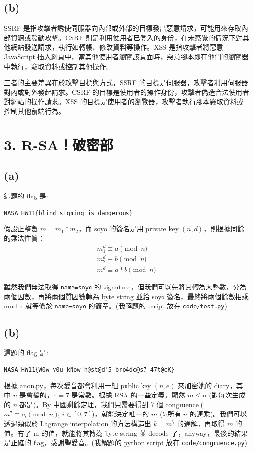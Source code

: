 \documentclass[12pt]{article}
\begin{document}
\subsection*{(b)}
SSRF 是指攻擊者誘使伺服器向內部或外部的目標發出惡意請求，可能用來存取內部資源或發動攻擊。CSRF 則是利用使用者已登入的身份，在未察覺的情況下對其他網站發送請求，執行如轉帳、修改資料等操作。XSS 是指攻擊者將惡意 JavaScript 插入網頁中，當其他使用者瀏覽該頁面時，惡意腳本即在他們的瀏覽器中執行，竊取資料或控制其他操作。

三者的主要差異在於攻擊目標與方式，SSRF 的目標是伺服器，攻擊者利用伺服器對內或對外發起請求。CSRF 的目標是使用者的操作身份，攻擊者偽造合法使用者對網站的操作請求。XSS 的目標是使用者的瀏覽器，攻擊者執行腳本竊取資料或控制其他前端行為。

\newpage
\section*{3. R-SA！破密部}
\subsection*{(a)}
這題的 flag 是:

{\centering\verb|NASA_HW11{blind_signing_is_dangerous}|\par}

假設正整數 $m=m_1*m_2$，而 soyo 的簽名是用 private key $(n,d)$，則根據同餘的乘法性質：
\begin{align*}
m_1^d\equiv a\pmod{n} \\
m_2^d\equiv b\pmod{n} \\
m^d\equiv a*b\pmod{n}
\end{align*}

雖然我們無法取得 \verb|name=soyo| 的 signature，但我們可以先將其轉為大整數，分為兩個因數，再將兩個質因數轉為 byte string 並給 soyo 簽名，最終將兩個餘數相乘 mod n 就等價於 \verb|name=soyo| 的簽章。(我解題的 script 放在 \verb|code/test.py|)

\subsection*{(b)}
這題的 flag 是:

{\centering\verb|NASA_HW11{W0w_y0u_kNow_h@st@d'5_bro4dc@s7_47t@cK}|\par}

根據 anon.py，每次愛音都會利用一組 public key $(n,e)$ 來加密她的 diary，其中 $n$ 是會變的，$e=7$ 是常數。根據 RSA 的一些定義，顯然 $m\le n$ (對每次生成的 $n$ 都是)。By \href{https://cp-algorithms.com/algebra/chinese-remainder-theorem.html}{中國剩餘定理}，我們只需要得到 7 個 congruence ($m^7\equiv c_i \pmod{n_i},\ i\in[0,7]$)，就能決定唯一的 $m$ ($le$所有 $n$ 的連乘)。我們可以透過類似於 Lagrange interpolation 的方法構造出 $k=m^7$ 的\href{https://cp-algorithms.com/algebra/chinese-remainder-theorem.html}{通解}，再取得 $m$ 的值。有了 m 的值，就能將其轉為 byte string 並 decode 了，anyway，最後的結果是正確的 flag，感謝聖愛音。(我解題的 python script 放在 \verb|code/congruence.py|)
\end{document}
